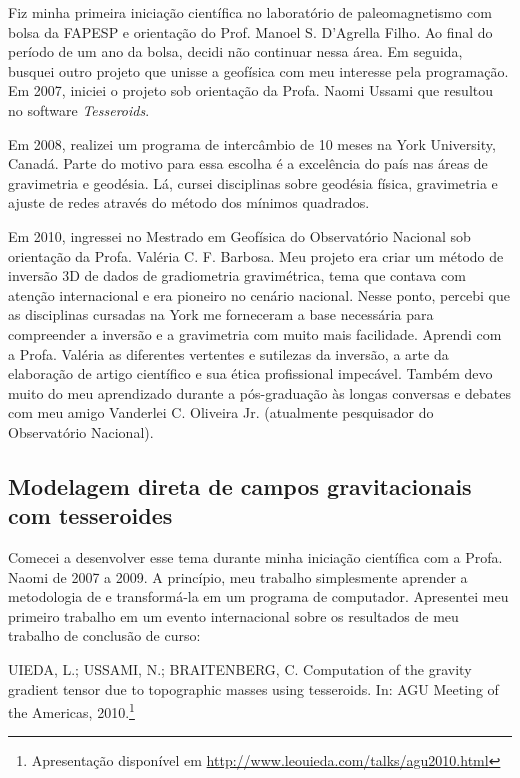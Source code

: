 Fiz minha primeira iniciação científica no laboratório de paleomagnetismo com
bolsa da FAPESP e orientação do Prof. Manoel S. D'Agrella Filho.
Ao final do período de um ano da bolsa, decidi não continuar nessa área.
Em seguida, busquei outro projeto que unisse a geofísica
com meu interesse pela programação.
Em 2007, iniciei o projeto sob orientação da
Profa. Naomi Ussami que resultou no software \textit{Tesseroids}.

Em 2008, realizei um programa de intercâmbio de 10 meses na York University,
Canadá.
Parte do motivo para essa escolha é a excelência do país nas áreas de
gravimetria e geodésia.
Lá, cursei disciplinas sobre geodésia física, gravimetria e ajuste de redes
através do método dos mínimos quadrados.

Em 2010, ingressei no Mestrado em Geofísica do Observatório Nacional sob
orientação da Profa. Valéria C. F. Barbosa.
Meu projeto era criar um método de inversão 3D de dados de gradiometria
gravimétrica, tema que contava com atenção internacional e era pioneiro no
cenário nacional.
Nesse ponto, percebi que as disciplinas cursadas na York me forneceram a base
necessária para compreender a inversão e a gravimetria com muito mais
facilidade.
Aprendi com a Profa. Valéria
as diferentes vertentes e sutilezas da inversão,
a arte da elaboração de artigo científico
e sua ética profissional impecável.
Também devo muito do meu aprendizado durante a pós-graduação às longas
conversas e debates com meu amigo Vanderlei C. Oliveira Jr. (atualmente
pesquisador do Observatório Nacional).



\subsection{Modelagem direta de campos gravitacionais com tesseroides}

Comecei a desenvolver esse tema durante minha iniciação científica com a
Profa. Naomi de 2007 a 2009.
A princípio, meu trabalho simplesmente aprender a metodologia de
\citet{wild-pfeiffer2008} e transformá-la em um programa de computador.
Apresentei meu primeiro trabalho em um evento internacional sobre os resultados
de meu trabalho de conclusão de curso:

\begin{displayquote}
    UIEDA, L.; USSAMI, N.; BRAITENBERG, C. Computation of the gravity
    gradient tensor due to topographic masses using tesseroids. In: AGU Meeting
    of the Americas, 2010.\footnote{Apresentação disponível em
    \url{http://www.leouieda.com/talks/agu2010.html}}
\end{displayquote}

